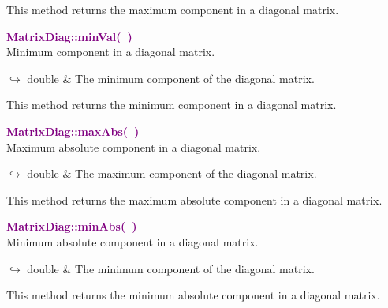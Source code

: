 This method returns the maximum component in a diagonal matrix.

\textcolor{purple}{\textbf{MatrixDiag::minVal(~)}}\label{MatrixDiag::minVal()}\\
Minimum component in a diagonal matrix.\vspace*{-0.5em}
\begin{tcolorbox}[grow to left by=-1cm, width=\textwidth-1cm,myArgs,tabularx={l|R}]
$\hookrightarrow$ double & The minimum component of the diagonal matrix.
\end{tcolorbox}

This method returns the minimum component in a diagonal matrix.

\textcolor{purple}{\textbf{MatrixDiag::maxAbs(~)}}\label{MatrixDiag::maxAbs()}\\
Maximum absolute component in a diagonal matrix.\vspace*{-0.5em}
\begin{tcolorbox}[grow to left by=-1cm, width=\textwidth-1cm,myArgs,tabularx={l|R}]
$\hookrightarrow$ double & The maximum component of the diagonal matrix.
\end{tcolorbox}

This method returns the maximum absolute component in a diagonal matrix.

\textcolor{purple}{\textbf{MatrixDiag::minAbs(~)}}\label{MatrixDiag::minAbs()}\\
Minimum absolute component in a diagonal matrix.\vspace*{-0.5em}
\begin{tcolorbox}[grow to left by=-1cm, width=\textwidth-1cm,myArgs,tabularx={l|R}]
$\hookrightarrow$ double & The minimum component of the diagonal matrix.
\end{tcolorbox}

This method returns the minimum absolute component in a diagonal matrix.

